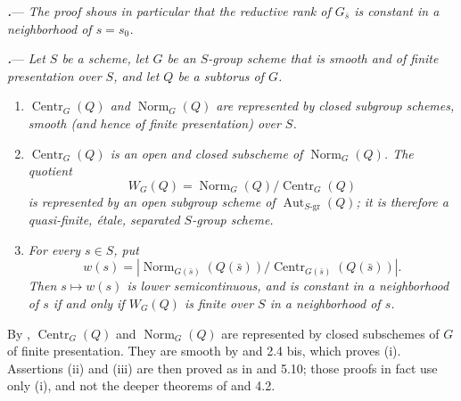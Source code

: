 \par\medskip\noindent
{}\textbf{\textit{.}}---
\textit{The proof shows in particular that the reductive rank of
\(G_{\bar s}\) is constant in a neighborhood of \(s=s_0\).}

\par\medskip\noindent
{}\textbf{\textit{.}}---
\textit{Let \(S\) be a scheme, let \(G\) be an \(S\)-group scheme
that is smooth and of finite presentation over \(S\), and let \(Q\)
be a subtorus of \(G\).}


\begin{enumerate}
\item[\textup{(i)}]
\textit{\(\operatorname{Centr}_G(Q)\) and
\(\operatorname{Norm}_G(Q)\) are represented by closed subgroup
schemes, smooth \textup{(and hence of finite presentation)} over
\(S\).}

\item[\textup{(ii)}]
\textit{\(\operatorname{Centr}_G(Q)\) is an open and closed
subscheme of \(\operatorname{Norm}_G(Q)\).  The quotient}
\[
  W_G(Q)
  =
  \operatorname{Norm}_G(Q)/\operatorname{Centr}_G(Q)
\]
\textit{is represented by an open subgroup scheme of
\(\operatorname{Aut}_{S\text{-}\mathrm{gr}}(Q)\); it is therefore a
quasi-finite, étale, separated \(S\)-group scheme.}

\item[\textup{(iii)}]
\textit{For every \(s\in S\), put}
\[
  w(s)
  =
  \left|
  \operatorname{Norm}_{G(\bar s)}(Q(\bar s))/
  \operatorname{Centr}_{G(\bar s)}(Q(\bar s))
  \right|.
\]
\textit{Then \(s\longmapsto w(s)\) is lower semicontinuous, and is
constant in a neighborhood of \(s\) if and only if \(W_G(Q)\) is
finite over \(S\) in a neighborhood of \(s\).}
\end{enumerate}

By ,
\(\operatorname{Centr}_G(Q)\) and \(\operatorname{Norm}_G(Q)\) are
represented by closed subschemes of \(G\) of finite presentation.
They are smooth by  and 2.4 bis, which proves
\textup{(i)}.  Assertions \textup{(ii)} and \textup{(iii)} are then
proved as in  and 5.10; those proofs in fact use only
\textup{(i)}, and not the deeper theorems of  and 4.2.


